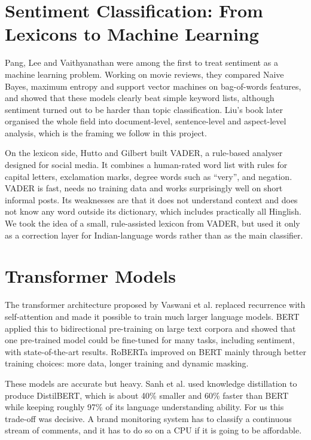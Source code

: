 \documentclass[12pt,a4paper]{report}
\begin{document}
\section{Sentiment Classification: From Lexicons to Machine Learning}

Pang, Lee and Vaithyanathan \cite{pang2002} were among the first to treat sentiment as a machine learning problem. Working on movie reviews, they compared Naive Bayes, maximum entropy and support vector machines on bag-of-words features, and showed that these models clearly beat simple keyword lists, although sentiment turned out to be harder than topic classification. Liu's book \cite{liu2012} later organised the whole field into document-level, sentence-level and aspect-level analysis, which is the framing we follow in this project.

On the lexicon side, Hutto and Gilbert \cite{hutto2014} built VADER, a rule-based analyser designed for social media. It combines a human-rated word list with rules for capital letters, exclamation marks, degree words such as ``very'', and negation. VADER is fast, needs no training data and works surprisingly well on short informal posts. Its weaknesses are that it does not understand context and does not know any word outside its dictionary, which includes practically all Hinglish. We took the idea of a small, rule-assisted lexicon from VADER, but used it only as a correction layer for Indian-language words rather than as the main classifier.

\section{Transformer Models}

The transformer architecture proposed by Vaswani et al. \cite{vaswani2017} replaced recurrence with self-attention and made it possible to train much larger language models. BERT \cite{devlin2019} applied this to bidirectional pre-training on large text corpora and showed that one pre-trained model could be fine-tuned for many tasks, including sentiment, with state-of-the-art results. RoBERTa \cite{liu2019roberta} improved on BERT mainly through better training choices: more data, longer training and dynamic masking.

These models are accurate but heavy. Sanh et al. \cite{sanh2019} used knowledge distillation to produce DistilBERT, which is about 40\% smaller and 60\% faster than BERT while keeping roughly 97\% of its language understanding ability. For us this trade-off was decisive. A brand monitoring system has to classify a continuous stream of comments, and it has to do so on a CPU if it is going to be affordable.
\end{document}
